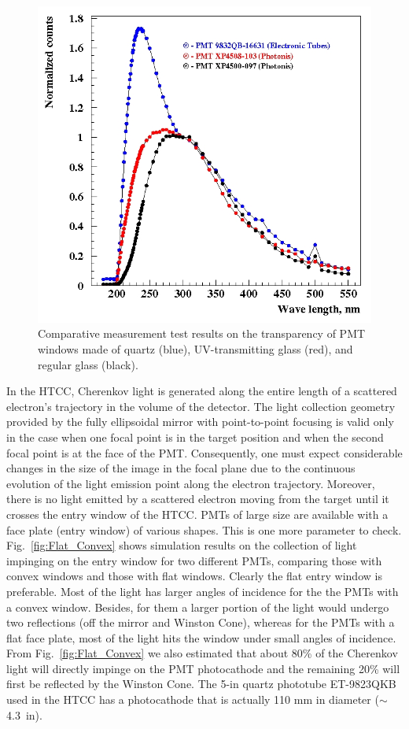 \begin{figure}[!ht]
    \centering
    \includegraphics[width=1.0\linewidth,trim={1.7cm 0.5cm 0.05cm 0.1cm},clip]{images/Quartz_UV_glass.jpg}
    \caption{Comparative measurement test results on the transparency of PMT windows made of quartz (blue),
      UV-transmitting glass (red), and regular glass (black).}
    \label{fig:Quartz_UV_glass}
\end{figure}

In the HTCC, Cherenkov light is generated along the entire length of a scattered electron's trajectory in the volume
of the detector. The light collection geometry provided by the fully ellipsoidal mirror with point-to-point focusing is
valid only in the case when one focal point is in the target position and when the second focal point is at the face of
the PMT. Consequently, one must expect considerable changes in the size of the image in the focal plane due to the
continuous evolution of the light emission point along the electron trajectory. Moreover, there is no light emitted by
a scattered electron moving from the target until it crosses the entry window of the HTCC. PMTs of large size are
available with a face plate (entry window) of various shapes. This is one more parameter to check.
Fig.~\ref{fig:Flat_Convex} shows simulation results on the collection of light impinging on the entry window for two
different PMTs, comparing those with convex windows and those with flat windows. Clearly the flat entry window is
preferable. Most of the light has larger angles of incidence for the the PMTs with a convex window. Besides,
for them a larger portion of the light would undergo two reflections (off the mirror and Winston Cone), whereas for
the PMTs with a flat face plate, most of the light hits the window under small angles of incidence. From
Fig.~\ref{fig:Flat_Convex} we also estimated that about 80\% of the Cherenkov light will directly impinge on the
PMT photocathode and the remaining 20\% will first be reflected by the Winston Cone. The 5-in quartz phototube
ET-9823QKB used in the HTCC has a photocathode that is actually 110 mm in diameter ($\sim$4.3~in). 

